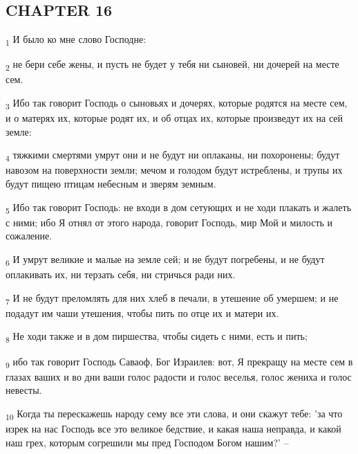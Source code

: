 \subsection{CHAPTER 16}
\begin{tcolorbox}
\textsubscript{1} И было ко мне слово Господне:
\end{tcolorbox}
\begin{tcolorbox}
\textsubscript{2} не бери себе жены, и пусть не будет у тебя ни сыновей, ни дочерей на месте сем.
\end{tcolorbox}
\begin{tcolorbox}
\textsubscript{3} Ибо так говорит Господь о сыновьях и дочерях, которые родятся на месте сем, и о матерях их, которые родят их, и об отцах их, которые произведут их на сей земле:
\end{tcolorbox}
\begin{tcolorbox}
\textsubscript{4} тяжкими смертями умрут они и не будут ни оплаканы, ни похоронены; будут навозом на поверхности земли; мечом и голодом будут истреблены, и трупы их будут пищею птицам небесным и зверям земным.
\end{tcolorbox}
\begin{tcolorbox}
\textsubscript{5} Ибо так говорит Господь: не входи в дом сетующих и не ходи плакать и жалеть с ними; ибо Я отнял от этого народа, говорит Господь, мир Мой и милость и сожаление.
\end{tcolorbox}
\begin{tcolorbox}
\textsubscript{6} И умрут великие и малые на земле сей; и не будут погребены, и не будут оплакивать их, ни терзать себя, ни стричься ради них.
\end{tcolorbox}
\begin{tcolorbox}
\textsubscript{7} И не будут преломлять для них хлеб в печали, в утешение об умершем; и не подадут им чаши утешения, чтобы пить по отце их и матери их.
\end{tcolorbox}
\begin{tcolorbox}
\textsubscript{8} Не ходи также и в дом пиршества, чтобы сидеть с ними, есть и пить;
\end{tcolorbox}
\begin{tcolorbox}
\textsubscript{9} ибо так говорит Господь Саваоф, Бог Израилев: вот, Я прекращу на месте сем в глазах ваших и во дни ваши голос радости и голос веселья, голос жениха и голос невесты.
\end{tcolorbox}
\begin{tcolorbox}
\textsubscript{10} Когда ты перескажешь народу сему все эти слова, и они скажут тебе: 'за что изрек на нас Господь все это великое бедствие, и какая наша неправда, и какой наш грех, которым согрешили мы пред Господом Богом нашим?' --
\end{tcolorbox}
